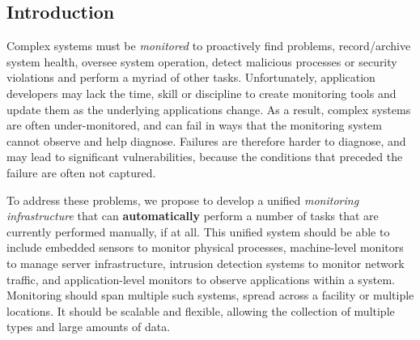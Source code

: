\subsection{Introduction}
\label{ssec:intro}

Complex systems must be {\em monitored} to proactively find problems,
record/archive system health, oversee system operation, detect
malicious processes or security violations and perform a myriad of
other tasks.  Unfortunately, application developers may lack the time, skill
or discipline to create monitoring tools and update them 
as the underlying applications change. As a result, complex systems
are often under-monitored, and can fail in ways that the monitoring
system cannot observe and help diagnose. Failures are therefore harder
to diagnose, and may lead to significant vulnerabilities, because the 
conditions that preceded the failure are often not captured.

To address these problems, we propose to develop a unified {\em
monitoring infrastructure} that can {\bf automatically} perform a
number of tasks that are currently performed manually, if at all.
This unified system should be able to include embedded sensors to
monitor physical processes, machine-level monitors to manage server
infrastructure, intrusion detection systems to monitor network
traffic, and application-level monitors to observe applications
within a system. Monitoring should span multiple such
systems, spread across a facility or multiple locations. It should be
scalable and flexible, allowing the collection of multiple types
and large amounts of data.


